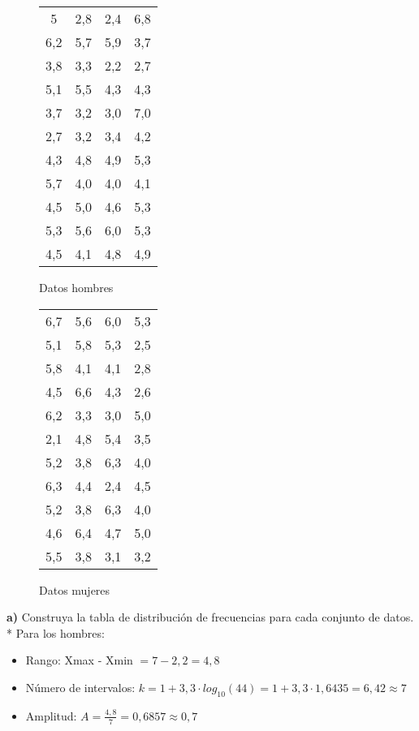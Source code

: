 \documentclass{templateNote}
\begin{document}
\begin{figure}[H]
    \centering
    \begin{minipage}{.45\textwidth}
        \centering
        \begin{tabular}{|c|c|c|c|}
            \hline
            5 & 2,8 & 2,4 & 6,8 \\
            6,2	& 5,7 & 5,9 & 3,7 \\
            3,8 & 3,3 & 2,2 & 2,7 \\
            5,1 & 5,5 & 4,3 & 4,3 \\
            3,7	& 3,2 & 3,0	& 7,0 \\
            2,7 & 3,2 & 3,4 & 4,2 \\
            4,3 & 4,8 & 4,9 & 5,3 \\
            5,7 & 4,0 & 4,0 & 4,1 \\
            4,5 & 5,0 & 4,6 & 5,3 \\
            5,3 & 5,6 & 6,0 & 5,3 \\
            4,5 & 4,1 & 4,8 & 4,9 \\
            \hline 
        \end{tabular}
        \caption{Datos hombres}
    \end{minipage}\hfill
    \begin{minipage}{.45\textwidth}
        \centering
        \begin{tabular}{|c|c|c|c|}
            \hline
            6,7&5,6&6,0&5,3\\
            5,1&5,8&5,3&2,5\\
            5,8&4,1&4,1&2,8\\
            4,5&6,6&4,3&2,6\\
            6,2&3,3&3,0&5,0\\
            2,1&4,8&5,4&3,5\\
            5,2&3,8&6,3&4,0\\
            6,3&4,4&2,4&4,5\\
            5,2&3,8&6,3&4,0\\
            4,6&6,4&4,7&5,0\\
            5,5&3,8&3,1&3,2\\
            \hline 
        \end{tabular}
        \caption{Datos mujeres}
    \end{minipage}
\end{figure}

\textbf{a)} Construya la tabla de distribución de frecuencias para cada conjunto de datos. 
* Para los hombres:\\
\begin{itemize}
    \item Rango: Xmax - Xmin $ = 7 - 2,2 = 4,8$
    
    \item Número de intervalos: $k = 1 + 3,3 \cdot log_{10}(44) = 1 + 3,3 \cdot 1,6435 = 6,42 \approx 7$
    
    \item Amplitud: $A = \frac{4,8}{7} = 0,6857 \approx 0,7$
\end{itemize}
\end{document}
